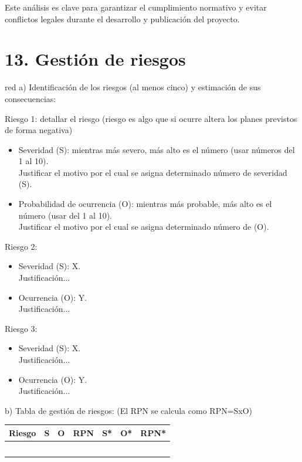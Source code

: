 \documentclass[
11pt, %
]{charter}
\begin{document}
Este análisis es clave para garantizar el cumplimiento normativo y evitar conflictos legales durante el desarrollo y publicación del proyecto.


\section{13. Gestión de riesgos}
\label{sec:riesgos}

\begin{consigna}{red}
a) Identificación de los riesgos (al menos cinco) y estimación de sus consecuencias:
 
Riesgo 1: detallar el riesgo (riesgo es algo que si ocurre altera los planes previstos de forma negativa)
\begin{itemize}
	\item Severidad (S): mientras más severo, más alto es el número (usar números del 1 al 10).\\
	Justificar el motivo por el cual se asigna determinado número de severidad (S).
	\item Probabilidad de ocurrencia (O): mientras más probable, más alto es el número (usar del 1 al 10).\\
	Justificar el motivo por el cual se asigna determinado número de (O). 
\end{itemize}   

Riesgo 2:
\begin{itemize}
	\item Severidad (S): X.\\
	Justificación...
	\item Ocurrencia (O): Y.\\
	Justificación...
\end{itemize}

Riesgo 3:
\begin{itemize}
	\item Severidad (S):  X.\\
	Justificación...
	\item Ocurrencia (O): Y.\\
	Justificación...
\end{itemize}


b) Tabla de gestión de riesgos:      (El RPN se calcula como RPN=SxO)

\begin{table}[htpb]
\centering
\begin{tabularx}{\linewidth}{@{}|X|c|c|c|c|c|c|@{}}
\hline
\rowcolor[HTML]{C0C0C0} 
Riesgo & S & O & RPN & S* & O* & RPN* \\ \hline
       &   &   &     &    &    &      \\ \hline
       &   &   &     &    &    &      \\ \hline
       &   &   &     &    &    &      \\ \hline
       &   &   &     &    &    &      \\ \hline
       &   &   &     &    &    &      \\ \hline
\end{tabularx}%
\end{table}


\end{consigna}
\end{document}
